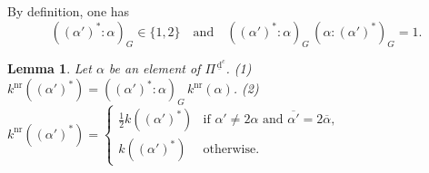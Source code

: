 \documentclass[11pt]{amsart}
\newcommand{\dc}{\,\underline{\mathrm{d}}^c}
\newtheorem{lemma}[thm]{Lemma}%
\begin{document}
{By definition, one has
\[((\alpha')^\ast:\alpha)_G \in \{1,2\}\quad \text{and}\quad 
((\alpha')^\ast:\alpha)_G\, (\alpha:(\alpha')^\ast)_G=1.\] 
\begin{lemma}\label{lemma:nr-countings1} 
Let $\alpha$ be an element of $\Pi^{\dc}$. 
\vskip 1mm
\noindent
{\rm (1)} $k^{\mathrm{nr}}((\alpha')^\ast)=
((\alpha')^\ast:\alpha)_G\, k^{\mathrm{nr}}(\alpha)$.
\vskip 1mm
\noindent
{\rm (2)}
$k^{\mathrm{nr}}((\alpha')^\ast)=\begin{cases}
\frac12 k((\alpha')^\ast) & \text{if }\alpha'\ne 2\alpha\text{ and }
\overline{\alpha'}=2\overline{\alpha},\\
k((\alpha')^\ast) & \text{otherwise}.
\end{cases}$
\end{lemma}

}
\end{document}
